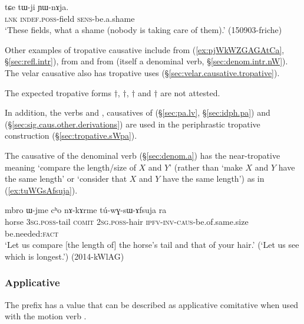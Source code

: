 \begin{exe}
\ex \label{ex:tWji.YWnAja}
\gll  tɕe tɯ-ji ɲɯ-nɤja.   \\
\textsc{lnk} \textsc{indef}.\textsc{poss}-field \textsc{sens}-be.a.shame \\
\glt `These fields, what a shame (nobody is taking care of them).' (150903-friche)
 \end{exe}
 

Other examples of tropative causative include  from  (\ref{ex:pjWkWZGAGAtCa}, §\ref{sec:refl.intr}),   from  and   from  (itself a denominal verb, §\ref{sec:denom.intr.nW}). The velar causative also has tropative uses (§\ref{sec:velar.causative.tropative}).

 The expected tropative forms $\dagger$, $\dagger$, $\dagger$ and $\dagger$ are not attested.

In addition, the verbs  and , causatives of  (§\ref{sec:pa.lv}, §\ref{sec:idph.pa}) and  (§\ref{sec:sig.caus.other.derivations}) are used in the periphrastic tropative construction (§\ref{sec:tropative.sWpa}).

The causative of the denominal verb  (§\ref{sec:denom.a}) has the near-tropative meaning `compare the length/size of $X$ and $Y$' (rather than `make $X$ and $Y$ have the same length' or `consider that $X$ and $Y$ have the same length') as in  (\ref{ex:tuWGsAfsuja}).

\begin{exe}
\ex \label{ex:tuWGsAfsuja}
\gll mbro ɯ-jme cʰo nɤ-kɤrme tú-wɣ-sɯ-ɤfsuja ra \\
horse \textsc{3sg}.\textsc{poss}-tail \textsc{comit} \textsc{2sg}.\textsc{poss}-hair \textsc{ipfv}-\textsc{inv}-\textsc{caus}-be.of.same.size be.needed:\textsc{fact} \\
\glt `Let us compare [the length of] the horse's tail and that of your hair.' (`Let us see which is longest.') (2014-kWlAG)
\end{exe}  

\subsubsection{Applicative} \label{sec:sig.caus.appl.comitative}
 
The  prefix has a value that can be described as applicative comitative when used with the motion verb . 

